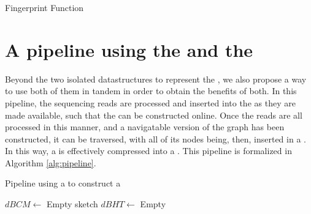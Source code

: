 \begin{algorithm}
  \caption{Fingerprint Function}\label{alg:fingerprint}
\end{algorithm}

\section{A pipeline using the \dBCM and the \dBHT}


Beyond the two isolated datastructures to represent the \dBG, we also propose a way to use both of them in tandem in order to obtain
the benefits of both. In this pipeline, the sequencing reads are processed and inserted into the \dBCM as they are made available,
such that the \dBG can be constructed online. Once the reads are all processed in this manner, and a navigatable version of the graph 
has been constructed, it can be traversed, with all of its nodes being, then, inserted in a \dBHT. In this way, a \dBCM is effectively
compressed into a \dBHT. This pipeline is formalized in Algorithm \ref{alg:pipeline}.

\begin{algorithm}
  \caption{Pipeline using a \dBCM to construct a \dBHT}\label{alg:pipeline}
  $\mathit{dBCM} \gets$ Empty \dBCM sketch\;
  $\mathit{dBHT} \gets$ Empty \dBHT\;
\end{algorithm}

